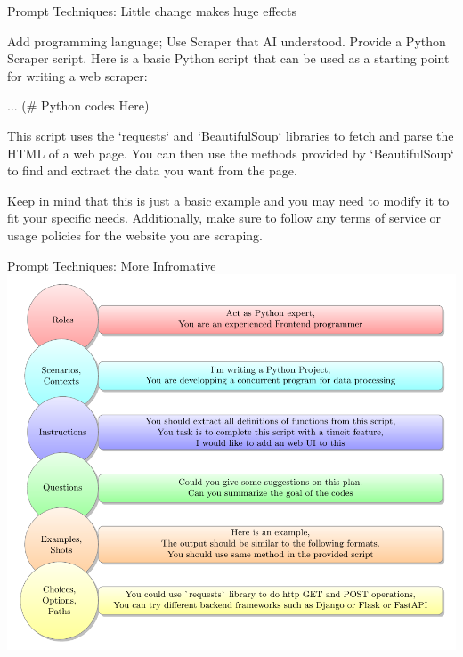 \documentclass{beamer}
\newcommand{\askanswer}[5]{ %
  \begin{tcolorbox}[
    title=#1,
    skin=bicolor,
    colframe=black,
    colbacklower=green!10,
    fontupper=\small,
    fontlower=\footnotesize,
    middle=0pt, %
    subtitle style = {
      boxrule=0.4pt,
      colback=gray,
    }
  ]
    #2
    \tcbsubtitle{You}
    {\color{blue} #3}
    \tcblower
    \tcbsubtitle{#4}
    #5
  \end{tcolorbox}
}
\begin{document}
\begin{frame}{Prompt Techniques: Little change makes huge effects}
  \askanswer{Little change makes huge effects}
  {Add programming language; Use Scraper that AI understood.}
  {Provide a Python Scraper script.}
  {Bing AI}
  {Here is a basic Python script that can be used as a starting point for writing a web scraper:
  
  ... {\color{green!50!black} (\# Python codes Here)}
      
      
      

  This script uses the `requests` and `BeautifulSoup` libraries to fetch and parse the HTML of a web page. You can then use the methods provided by `BeautifulSoup` to find and extract the data you want from the page.
  
  Keep in mind that this is just a basic example and you may need to modify it to fit your specific needs. Additionally, make sure to follow any terms of service or usage policies for the website you are scraping.}

\end{frame}

\begin{frame}{Prompt Techniques: More Infromative}
  \centering
  \includegraphics[width=\linewidth,height=0.8\textheight,keepaspectratio]{./tikz-prompt-techniques-more-informative.pdf}
\end{frame}
\end{document}
